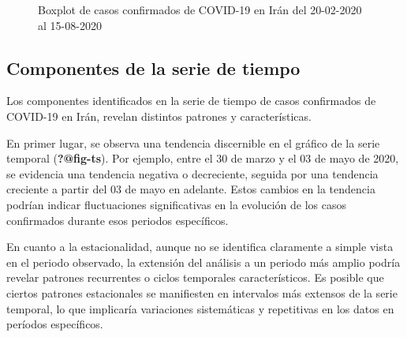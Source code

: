 \documentclass[
  us-letterpaper,
]{scrreprt}
\theoremstyle{definition}
\theoremstyle{plain}
\theoremstyle{plain}
\theoremstyle{definition}
\theoremstyle{remark}
\begin{document}
\begin{figure}


\caption{\label{fig-box}Boxplot de casos confirmados de COVID-19 en Irán
del 20-02-2020 al 15-08-2020}

\end{figure}%

\subsection{Componentes de la serie de
tiempo}\label{componentes-de-la-serie-de-tiempo}

Los componentes identificados en la serie de tiempo de casos confirmados
de COVID-19 en Irán, revelan distintos patrones y características.

En primer lugar, se observa una tendencia discernible en el gráfico de
la serie temporal (\textbf{?@fig-ts}). Por ejemplo, entre el 30 de marzo
y el 03 de mayo de 2020, se evidencia una tendencia negativa o
decreciente, seguida por una tendencia creciente a partir del 03 de mayo
en adelante. Estos cambios en la tendencia podrían indicar fluctuaciones
significativas en la evolución de los casos confirmados durante esos
periodos específicos.

En cuanto a la estacionalidad, aunque no se identifica claramente a
simple vista en el periodo observado, la extensión del análisis a un
periodo más amplio podría revelar patrones recurrentes o ciclos
temporales característicos. Es posible que ciertos patrones estacionales
se manifiesten en intervalos más extensos de la serie temporal, lo que
implicaría variaciones sistemáticas y repetitivas en los datos en
períodos específicos.
\end{document}
